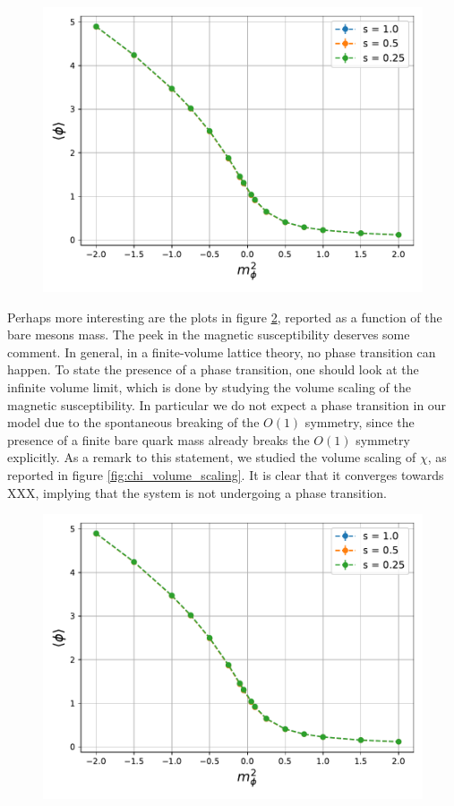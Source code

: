 \begin{figure}
    \centering
    \includegraphics[scale=0.7]{figures/phase_trans/phi.pdf}
    \caption{}
    \label{fig:bs_NJL_magnetisation_yukawa}
\end{figure}

Perhaps more interesting are the plots in figure \ref{fig:bs_NJL_quantities_mass}, reported as a function of the bare mesons mass. 
The peek in the magnetic susceptibility deserves some comment. In general, in a finite-volume lattice theory, no phase transition can happen. To state the presence of a phase transition, one should look at the infinite volume limit, which is done by studying the volume scaling of the magnetic susceptibility. In particular we do not expect a phase transition in our model due to the spontaneous breaking of the $O(1)$ symmetry, since the presence of a finite bare quark mass already breaks the $O(1)$ symmetry explicitly. As a remark to this statement, we studied the volume scaling of $\chi$, as reported in figure \ref{fig:chi_volume_scaling}. It is clear that it converges towards XXX, implying that the system is not undergoing a phase transition.

\begin{figure}
    \centering
    \includegraphics[scale=0.7]{figures/phase_trans/phi.pdf}
    \caption{}
    \label{fig:bs_NJL_quantities_mass}
\end{figure}

